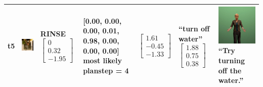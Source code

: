 \begin{longtable}{| V{0.8cm} | V{2.6cm} | V{1.6cm} | V{2.1cm} | V{1.55cm} | V{1.6cm} | V{3.2cm} |}
t5 &
\includegraphics[width=\linewidth]{fig/system/_slow2-rinse2-2_.jpg} &
RINSE
\linebreak\linebreak
$\begin{bmatrix}
0 \\
0.32 \\
-1.95
\end{bmatrix}$ &
[0.00, 0.00, 0.00, 0.01, 0.98, 0.00, 0.00, 0.00] most likely planstep = 4 &
$\begin{bmatrix}
1.61 \\
-0.45 \\
-1.33
\end{bmatrix}$ &
``turn off water''
\linebreak\linebreak
$\begin{bmatrix}
1.88 \\
0.75 \\
0.38
\end{bmatrix}$ &
\includegraphics[width=2.6cm]{fig/prompt/_try-turning-off-the-water_.jpg}
\linebreak
\footnotesize
``Try turning off the water.''
\\ \hline




\end{longtable}
